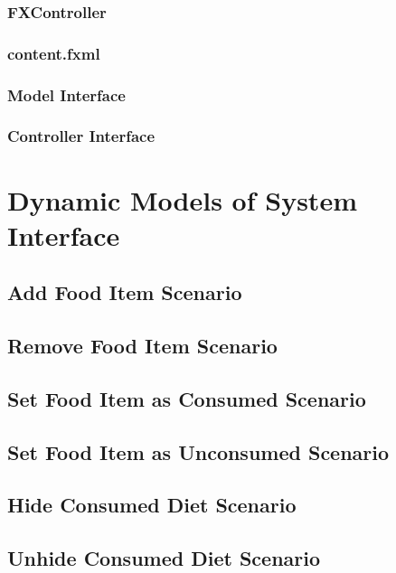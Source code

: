 \documentclass{scrreprt}
\begin{document}
\subsubsection{FXController}
\subsubsection{content.fxml}
\subsubsection{Model Interface}
\subsubsection{Controller Interface}
\section{Dynamic Models of System Interface}
\subsection{Add Food Item Scenario}
\subsection{Remove Food Item Scenario}
\subsection{Set Food Item as Consumed Scenario}
\subsection{Set Food Item as Unconsumed Scenario}
\subsection{Hide Consumed Diet Scenario}
\subsection{Unhide Consumed Diet Scenario}
\end{document}
